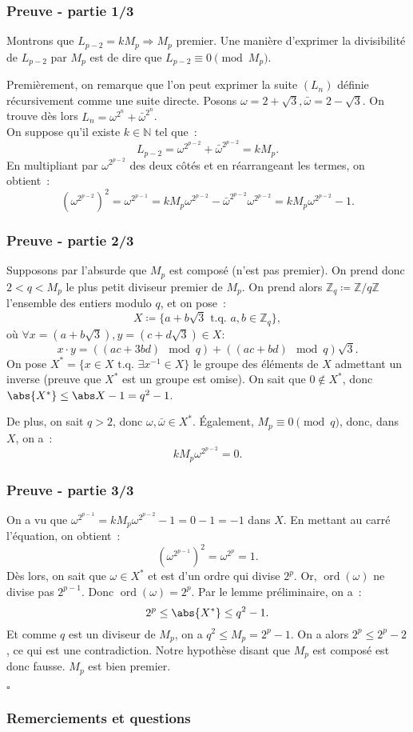 \documentclass[10pt, mathserif]{beamer}
\DeclareMathOperator{\ord}{ord}
\newcommand{\tq}{\text{ t.q. }}
\newcommand{\Z}{\mathbb Z}
\newcommand{\N}{\mathbb N}
\theoremstyle{definition}
\theoremstyle{remark}
\begin{document}
	\begin{frame}
		\frametitle{Preuve - partie 1/3}

		Montrons que $L_{p-2} = kM_p \Rightarrow M_p$ premier. Une manière d'exprimer la divisibilité de $L_{p-2}$ par $M_p$ est de dire que
		$L_{p-2} \equiv 0 \pmod {M_p}$.

		Premièrement, on remarque que l'on peut exprimer la suite $(L_n)$ définie récursivement comme une suite directe. Posons
		$\omega = 2 + \sqrt 3, \bar \omega = 2 - \sqrt 3$. On trouve dès lors $L_n = \omega^{2^n} + \bar \omega^{2^n}$. \\

		On suppose qu'il existe $k \in \N$ tel que~:
		\[L_{p-2} = \omega^{2^{p-2}} + \bar \omega^{2^{p-2}} = kM_p.\]
		En multipliant par $\omega^{2^{p-2}}$ des deux côtés et en réarrangeant les termes, on obtient~:
		\[\left(\omega^{2^{p-2}}\right)^2 = \omega^{2^{p-1}} = kM_p\omega^{2^{p-2}} - \bar \omega^{2^{p-2}}\omega^{2^{p-2}} = kM_p\omega^{2^{p-2}} - 1.\]
	\end{frame}

	\begin{frame}
		\frametitle{Preuve - partie 2/3}

		Supposons par l'absurde que $M_p$ est composé (n'est pas premier). On prend donc $2 < q < M_p$ le plus petit diviseur premier de $M_p$. On prend
		alors $\Z_q \coloneqq \Z/q\Z$ l'ensemble des entiers modulo $q$, et on pose~:
		\[X \coloneqq \{a + b\sqrt 3 \tq a, b \in \Z_q\},\]
		où $\forall x = (a+b\sqrt 3), y = (c+d\sqrt 3) \in X :$
		\[x \cdot y = \left((ac+3bd) \mod q\right) + \left((ac+bd) \mod q\right)\sqrt 3.\]
		On pose $X^* = \{x \in X \tq \exists x^{-1} \in X\}$ le groupe des éléments de $X$ admettant un inverse (preuve que $X^*$ est un groupe est omise).
		On sait que $0 \not \in X^*$, donc $\abs {X^*} \leq \abs X -1=q^2 - 1$.

		De plus, on sait $q > 2$, donc $\omega, \bar \omega \in X^*$. Également, $M_p \equiv 0 \pmod q$, donc, dans $X$, on a~:
		\[kM_p\omega^{2^{p-2}} = 0.\]
	\end{frame}
	
	\begin{frame}
		\frametitle{Preuve - partie 3/3}

		On a vu que $\omega^{2^{p-1}} = kM_p\omega^{2^{p-2}} - 1 = 0 - 1 = -1$ dans $X$. En mettant au carré l'équation, on obtient~:
		\[\left(\omega^{2^{p-1}}\right)^2 = \omega^{2^p} = 1.\]
		Dès lors, on sait que $\omega \in X^*$ et est d'un ordre qui divise $2^p$. Or, $\ord(\omega)$ ne divise pas $2^{p-1}$. Donc $\ord(\omega) = 2^p$.
		Par le lemme préliminaire, on a~:
		\[2^p \leq \abs {X^*} \leq q^2 - 1.\]
		Et comme $q$ est un diviseur de $M_p$, on a $q^2 \leq M_p = 2^p-1$. On a alors $2^p \leq 2^p - 2$, ce qui est une contradiction. Notre hypothèse disant que
		$M_p$ est composé est donc fausse. $M_p$ est bien premier.
		
		\begin{flushright}$\square$\end{flushright}
	\end{frame}

	\begin{frame}
		\frametitle{Remerciements et questions}
	\end{frame}
\end{document}
